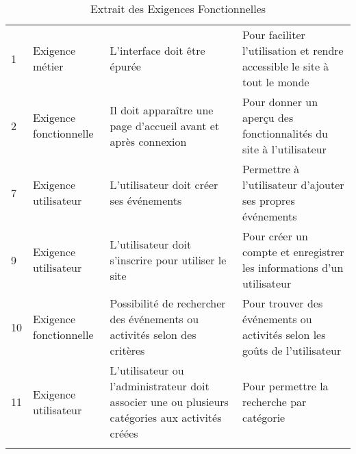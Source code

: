 \documentclass[a4paper,12pt]{article}
\begin{document}
{
\small
\begin{longtable}{|p{0.5cm}|p{2cm}|p{6cm}|p{6cm}|}%
\hline
\cellcolor{gray}{\textbf{ID}} & \cellcolor{gray}{\textbf{Catégorie (Wiegers)}} & \cellcolor{gray}{\textbf{Description}} & \cellcolor{gray}{\textbf{Justification}}\\ \hline \endhead  %

\endfoot

1 & Exigence métier & L'interface doit être épurée & Pour faciliter l'utilisation et rendre accessible le site à tout le monde\\\hline%

2 & Exigence fonctionnelle & Il doit apparaître une page d'accueil avant et après connexion & Pour donner un aperçu des fonctionnalités du site à l'utilisateur\\\hline %

7 & Exigence utilisateur & L'utilisateur doit créer ses événements & Permettre à l'utilisateur d'ajouter ses propres événements\\\hline %

9 & Exigence utilisateur & L'utilisateur doit s'inscrire pour utiliser le site & Pour créer un compte et enregistrer les informations d'un utilisateur\\\hline %

10 & Exigence fonctionnelle & Possibilité de rechercher des événements ou activités selon des critères & Pour trouver des événements ou activités selon les goûts de l'utilisateur\\\hline %

11 & Exigence utilisateur & L'utilisateur ou l'administrateur doit associer une ou plusieurs catégories aux activités créées & Pour permettre la recherche par catégorie\\\hline %

\caption{Extrait des Exigences Fonctionnelles}
\end{longtable}
}
\end{document}

